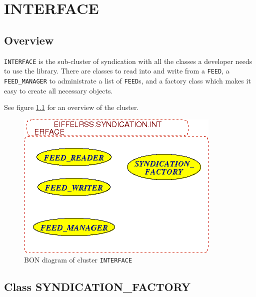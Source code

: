 \part{INTERFACE}


\chapter{Overview}
\label{cha:overview}

\texttt{INTERFACE} is the sub-cluster of syndication with all the
classes a developer needs to use the library. There are classes to
read into and write from a \texttt{FEED}, a \texttt{FEED\_MANAGER} to
administrate a list of \texttt{FEED}s, and a factory class which makes
it easy to create all necessary objects.

See figure \ref{fig:interface} for an overview of the cluster.

\begin{figure}[htbp]
  \centering
  \includegraphics[scale=.6]{./figures/EIFFELRSS_SYNDICATION_INTERFACE}
  \caption{BON diagram of cluster \texttt{INTERFACE}}
  \label{fig:interface}
\end{figure}


\chapter{Class SYNDICATION\_FACTORY}
\label{cha:syndiction-factory}



